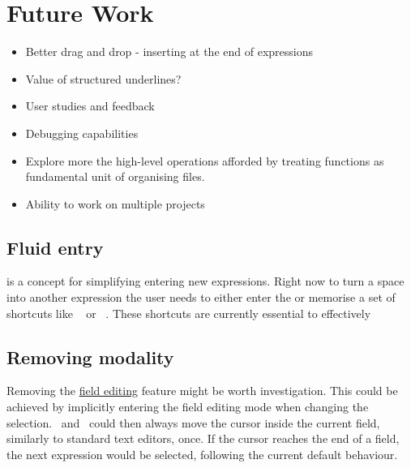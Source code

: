 \section{Future Work}

\begin{itemize}[noitemsep]
	\item Better drag and drop - inserting at the end of expressions
	\item Value of structured underlines?
	\item User studies and feedback
	\item Debugging capabilities
	\item Explore more the high-level operations afforded by treating functions as
	fundamental unit of organising files.
	\item Ability to work on multiple projects
\end{itemize}

\subsection{Fluid entry}
 is a concept for simplifying entering new expressions. Right
now to turn a space into another expression the user needs to either enter the
\hyperref[soln:space_popover]{} or memorise a set of
shortcuts like
\hyperref[cmd:make_var]{}~ or
\hyperref[cmd:make_var]{}~.
These shortcuts are currently essential to effectively 

\subsection{Removing modality}

Removing the \hyperref[soln:field_editing]{field editing} feature might be
worth investigation. This could be achieved by implicitly entering the field
editing mode when changing the selection. \ak{<}~and~\ak{>} could then always
move the cursor inside the current field, similarly to standard text editors,
once. If the cursor reaches the end of a field, the next expression would be
selected, following the current default behaviour.